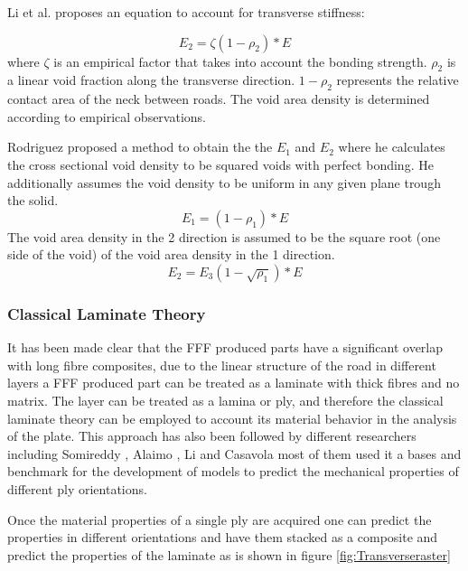 Li et al. \cite{Li2002CompositeProperties} proposes an equation to account for transverse stiffness:

\begin{equation} \label{eqn:ROMseriesfactor}
E_2=\zeta(1-\rho_2)*E
\end{equation}
where $\zeta$ is an empirical factor that takes into account the bonding strength. $\rho_2$ is a linear void fraction along the transverse direction. $1-\rho_2$  represents the relative contact area of the neck between roads. The void area density is determined according to empirical observations. 

Rodriguez \cite{Rodriguez2003MechanicalModeling} proposed a method to obtain the the $E_1$ and $E_2$ where he calculates the cross sectional void density to be squared voids with perfect bonding. He additionally assumes the void density to be uniform in any given plane trough the solid. 
\begin{equation}\label{eqn:E_1}
E_1=(1-\rho_1)*E
\end{equation}The void area density in the 2 direction is assumed to be the square root (one side of the void) of the void area density in the 1 direction.
\begin{equation}\label{eqn:E_2}
E_2=E_3(1-\sqrt{\rho_1})*E
\end{equation}
\subsubsection{Classical Laminate Theory}
It has been made clear that the FFF produced parts have a significant overlap with long fibre composites, due to the linear structure of the road in different layers a FFF produced part can be treated as a laminate with thick fibres and no matrix. The layer can be treated as a lamina or ply, and therefore the classical laminate theory can be employed to account its material behavior in the analysis of the plate. This approach has also been followed by different researchers including Somireddy \cite{Somireddy2018DevelopmentFDM}\cite{Somireddy2017FlexuralStudy}\cite{Somireddy2017MechanicalMesostructure}, Alaimo \cite{Alaimo2017InfluenceParts}, Li \cite{Li2002CompositeProperties} and Casavola \cite{Casavola2016OrthotropicTheory} most of them used it a bases and benchmark for the development of  models to predict the mechanical properties of different ply orientations.

Once the material properties of a single ply are acquired one can predict the properties in different orientations and have them stacked as a composite and predict the properties of the laminate as is shown in figure \ref{fig:Transverseraster}

